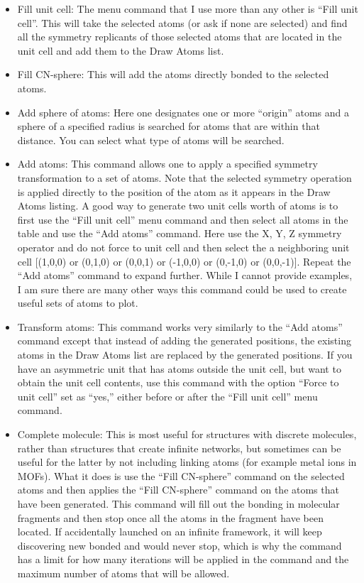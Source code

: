 \begin{itemize}
    \item Fill unit cell: The menu command that I use more than any other is ``Fill unit cell''. This will take the selected atoms (or ask if none are selected) and find all the symmetry replicants of those selected atoms that are located in the unit cell and add them to the Draw Atoms list.
    \item Fill CN-sphere: This will add the atoms directly bonded to the selected atoms. 
    \item Add sphere of atoms: Here one designates one or more ``origin'' atoms and a sphere of a specified radius is searched for atoms that are within that distance. You can select what type of atoms will be searched. 
    \item Add atoms: This command allows one to apply a specified symmetry transformation to a set of atoms. Note that the selected symmetry operation is applied directly to the position of the atom as it appears in the Draw Atoms listing. A good way to generate two unit cells worth of atoms is to first use the ``Fill unit cell'' menu command and then select all atoms in the table and use the ``Add atoms'' command. Here use the X, Y, Z symmetry operator and do not force to unit cell and then select the a neighboring unit cell [(1,0,0) or (0,1,0) or (0,0,1) or (-1,0,0) or (0,-1,0) or (0,0,-1)]. Repeat the  ``Add atoms'' command to expand further. While I cannot provide examples, I am sure there are many other ways this command could be used to create useful sets of atoms to plot. 
    \item Transform atoms: This command works very similarly to the  ``Add atoms'' command except that instead of adding the generated positions, the existing atoms in the Draw Atoms list are replaced by the generated positions. If you have an asymmetric unit that has atoms outside the unit cell, but want to obtain the unit cell contents, use this command with the option ``Force to unit cell'' set as ``yes,'' either before or after the ``Fill unit cell'' menu command. 
    \item Complete molecule: This is most useful for structures with discrete molecules, rather than structures that create infinite networks, but sometimes can be useful for the latter by not including linking atoms (for example metal ions in MOFs). What it does is use the ``Fill CN-sphere'' command on the selected atoms and then applies the ``Fill CN-sphere'' command on the atoms that have been generated. This command will fill out the bonding in molecular fragments and then stop once all the atoms in the fragment have been located. If accidentally launched on an infinite framework, it will keep discovering new bonded and would never stop, which is why the command has a limit for how many iterations will be applied in the command and the maximum number of atoms that will be allowed. 
\end{itemize}


